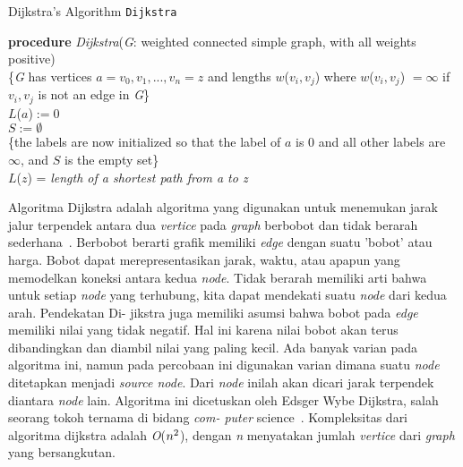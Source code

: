 \documentclass[conference]{IEEEtran}
\let\oldemptyset\emptyset
\let\emptyset\varnothing
\begin{document}
\begin{algorithm}
    \SetAlgoLined
    \DontPrintSemicolon
    \caption{Dijkstra's Algorithm \texttt{Dijkstra}}
    \textbf{procedure} \emph{Dijkstra}(\emph{G}: weighted connected simple
    graph, with all weights positive)\\
    \{\emph{G} has vertices $a = v_0, v_1, ..., v_n = z$ and lengths
    $w$($v_i, v_j$) where $w$($v_i, v_j$) $= \infty$ if $v_i, v_j$ is not an
    edge in \emph{G}\}\\
    $L$($a$)$ := 0$\\
    $S := \oldemptyset$\\
    \{the labels are now initialized so that the label of $a$ is
    0 and all other labels are $\infty$, and $S$ is the empty set\}\\
   \Return $L$($z$) = \textit{length of a shortest path from a to z}%
\end{algorithm}
\setlength{\intextsep}{5pt} 
    Algoritma Dijkstra adalah algoritma yang digunakan untuk
    menemukan  jarak  jalur  terpendek  antara  dua \emph{vertice} pada
    \emph{graph} berbobot  dan  tidak  berarah  sederhana~\cite{rosen-discrete-2012}. Berbobot
    berarti grafik memiliki \emph{edge} dengan suatu ’bobot’ atau harga.
    Bobot  dapat  merepresentasikan  jarak,  waktu,  atau  apapun
    yang  memodelkan  koneksi  antara  kedua \emph{node}.  Tidak  berarah
    memiliki  arti  bahwa  untuk  setiap \emph{node} yang  terhubung,  kita
    dapat mendekati suatu \emph{node} dari kedua arah. Pendekatan Di-
    jikstra juga memiliki asumsi bahwa bobot pada \emph{edge} memiliki
    nilai  yang  tidak  negatif.  Hal  ini  karena  nilai  bobot  akan
    terus  dibandingkan  dan  diambil  nilai  yang  paling  kecil.  Ada
    banyak  varian  pada  algoritma  ini,  namun  pada  percobaan
    ini  digunakan  varian  dimana  suatu \emph{node} ditetapkan  menjadi
    \emph{source node}. Dari \emph{node} inilah  akan  dicari  jarak  terpendek
    diantara \emph{node} lain.  Algoritma  ini  dicetuskan  oleh  Edsger
    Wybe  Dijkstra,  salah  seorang  tokoh  ternama  di  bidang \emph{com-
    puter} science~\cite{dijkstra-note-1959}. Kompleksitas dari algoritma dijkstra adalah
    \emph{O}($n\sp{2}$), dengan \emph{n} menyatakan jumlah \emph{vertice} dari \emph{graph} yang
    bersangkutan.
\end{document}
